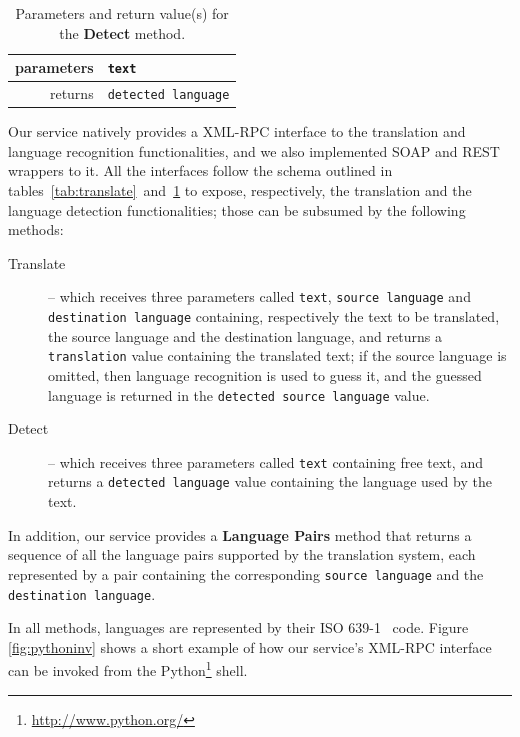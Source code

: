 \documentclass[11pt]{article}
\begin{document}
\begin{table}[!ht]
\begin{center}
 \begin{tabular}{|r|l|}
  \hline
   parameters	& {\tt\small text} \\
  \hline \hline
   returns 	& {\tt\small detected language}\\
  \hline
 \end{tabular}
\end{center}
\caption{Parameters and return value(s) for the {\bf Detect} method.}
\label{tab:detect}
\end{table}

Our service natively provides a XML-RPC interface to the translation and language recognition functionalities, and we also implemented SOAP and REST wrappers to it. All the interfaces follow the schema outlined in tables~\ref{tab:translate}~and~\ref{tab:detect} to expose, respectively, the translation and the language detection functionalities; those can be subsumed by the following methods:

\begin{description}
 \item[Translate] -- which receives three parameters called {\tt\small text}, {\tt\small source language} and {\tt\small destination language} containing, respectively the text to be translated, the source language and the destination language, and returns a {\tt\small translation} value containing the translated text; if the source language is omitted, then language recognition is used to guess it, and the guessed language is returned in the {\tt\small detected source language} value.
 \item[Detect] -- which receives three parameters called {\tt\small text} containing free text, and returns a {\tt\small detected language} value containing the language used by the text.
\end{description}

In addition, our service provides a {\bf Language Pairs} method that returns a sequence of all the language pairs supported by the translation system, each represented by a pair containing the corresponding {\tt\small source language} and the {\tt\small destination language}.


In all methods, languages are represented by their ISO 639-1~\citep{ISO:639-1} code. Figure \ref{fig:pythoninv} shows a short example of how our service's XML-RPC interface can be invoked from the Python\footnote{\small\url{http://www.python.org/}} shell.
\end{document}
